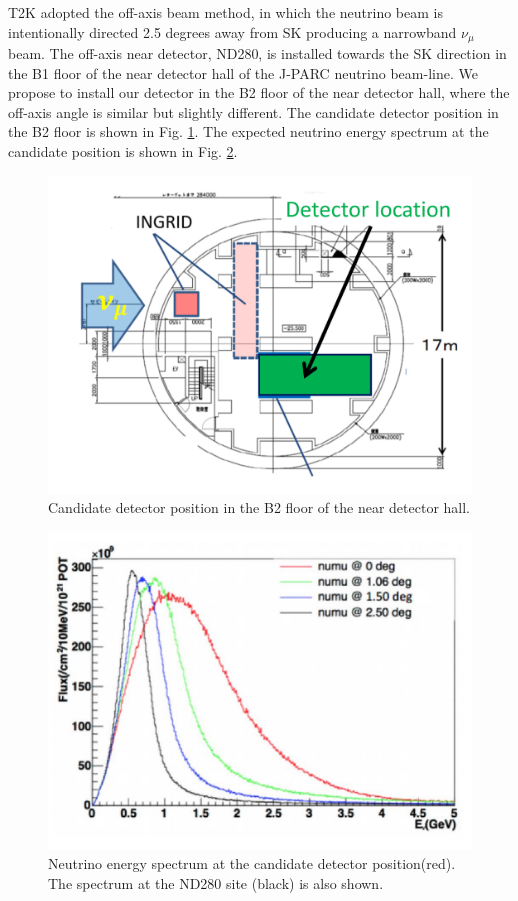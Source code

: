 T2K adopted the off-axis beam method, in which
the neutrino beam is intentionally directed 2.5 degrees away from SK producing a narrowband $\nu_{\mu}$ beam.
The off-axis near detector, ND280, is installed towards the SK direction in the B1 floor of the near detector hall of the J-PARC neutrino beam-line.
We propose to install our detector in the B2 floor of the near detector hall, 
where the off-axis angle is similar but slightly different.
The candidate detector position in the B2 floor is shown in Fig. \ref{fig:location}.
The expected neutrino energy spectrum at the candidate position is shown in Fig. \ref{fig:b2flux}.

\begin{figure}[tbh]
\begin{center}
\includegraphics[width=0.6\linewidth]{fig/detector_position_b2.pdf}
\end{center}
\caption{
Candidate detector position in the B2 floor of the near detector hall.
}
\label{fig:location}
\end{figure}

\begin{figure}[tbh]
\begin{center}
\includegraphics[width=0.6\linewidth]{fig/fluxes.pdf}
\end{center}
\caption{
Neutrino energy spectrum at the candidate detector position(red).
The spectrum at the ND280 site (black) is also shown.
}
\label{fig:b2flux}
\end{figure}

